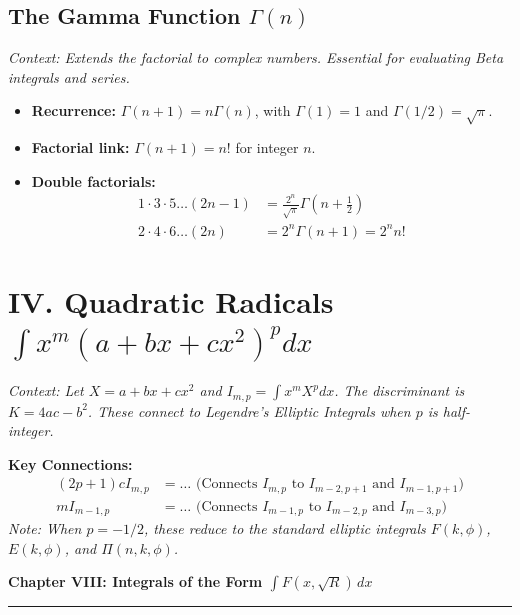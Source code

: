 \documentclass[11pt, a4paper]{article}
\begin{document}
\subsection*{\color{secondary} The Gamma Function $\Gamma(n)$}
\textit{\small Context: Extends the factorial to complex numbers. Essential for evaluating Beta integrals and series.}
\begin{itemize}[leftmargin=*, nosep]
    \item \textbf{\color{accent}Recurrence:} $\Gamma(n+1) = n\Gamma(n)$, with $\Gamma(1) = 1$ and $\Gamma(1/2) = \sqrt{\pi}$.
    \item \textbf{\color{accent}Factorial link:} $\Gamma(n+1) = n!$ for integer $n$.
    \item \textbf{\color{accent}Double factorials:} 
    \begin{align*}
        1 \cdot 3 \cdot 5 \dots (2n-1) &= \frac{2^n}{\sqrt{\pi}} \Gamma\left(n+\frac{1}{2}\right) \\
        2 \cdot 4 \cdot 6 \dots (2n) &= 2^n \Gamma(n+1) = 2^n n!
    \end{align*}
\end{itemize}

\section*{\color{primary} IV. Quadratic Radicals $\int x^m (a+bx+cx^2)^p dx$}

\textit{\small Context: Let $X = a+bx+cx^2$ and $I_{m,p} = \int x^m X^p dx$. The discriminant is $K = 4ac-b^2$. These connect to Legendre's Elliptic Integrals when $p$ is half-integer.}

\textbf{\color{accent}Key Connections:}
\begin{align*}
    (2p+1)c I_{m,p} &= \dots \text{ (Connects } I_{m,p} \text{ to } I_{m-2, p+1} \text{ and } I_{m-1, p+1}) \\
    m I_{m-1, p} &= \dots \text{ (Connects } I_{m-1, p} \text{ to } I_{m-2, p} \text{ and } I_{m-3, p})
\end{align*}
\textit{\small Note: When $p=-1/2$, these reduce to the standard elliptic integrals $F(k, \phi)$, $E(k, \phi)$, and $\Pi(n, k, \phi)$.}

\newpage

\begin{center}
    {\LARGE \bfseries \color{accent} Chapter VIII: Integrals of the Form $\int F(x, \sqrt{R})\,dx$}\\
    \vspace{0.2cm}
    {\color{accent}\rule{0.55\linewidth}{0.8pt}}
\end{center}
\vspace{0.35cm}
\end{document}
